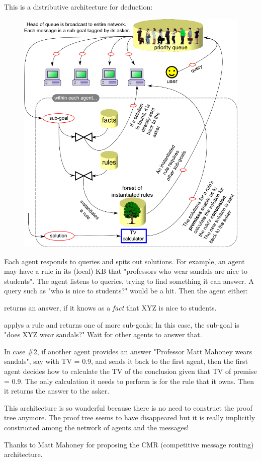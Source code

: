 This is a distributive architecture for deduction:

\begin{figure}[H]
\centering
\includegraphics[scale=0.6]{breakdown-IE-2.png}
\end{figure}

Each agent responds to queries and spits out solutions. For example, an agent may have a rule in its (local) KB that "professors who wear sandals are nice to students".  The agent listens to queries, trying to find something it can answer.  A query such as "who is nice to students?" would be a hit.  Then the agent either:

\begin{compactenum}
\item returns an answer, if it knows as a \textit{fact} that XYZ is nice to students.
\item applys a rule and returns one of more sub-goals;  In this case, the sub-goal is "does XYZ wear sandals?"  Wait for other agents to answer that.
\end{compactenum}

In case \#2, if another agent provides an answer "Professor Matt Mahoney wears sandals", say with TV = 0.9, and sends it back to the first agent, then the first agent decides how to calculate the TV of the conclusion given that TV of premise = 0.9.  The only calculation it needs to perform is for the rule that it owns.  Then it returns the answer to the asker.

This architecture is so wonderful because there is no need to construct the proof tree anymore. The proof tree seems to have disappeared but it is really implicitly constructed among the network of agents and the messages!

Thanks to Matt Mahoney for proposing the CMR (competitive message routing) architecture.
